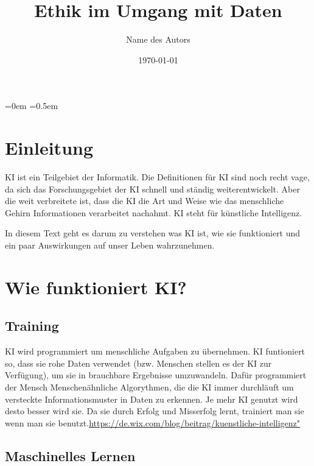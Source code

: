 \documentclass{report}
\title{Ethik im Umgang mit Daten}
\author{Name des Autors}
\date{\today}
\begin{document}
\maketitle


\tableofcontents
\parindent=0em
\parskip=0.5em
\chapter{Einleitung}

KI ist ein Teilgebiet der Informatik. Die Definitionen für KI sind noch recht vage, da sich das Forschungsgebiet der KI schnell und ständig weiterentwickelt. Aber die weit verbreitete ist,
dass die KI die Art und Weise wie das menschliche Gehirn Informationen verarbeitet nachahmt. KI steht für künstliche Intelligenz. 

In diesem Text geht es darum zu verstehen was KI ist, wie sie funktioniert und ein paar Auswirkungen auf unser Leben wahrzunehmen.

\chapter{Wie funktioniert KI?}

\section{Training}
KI wird programmiert um menschliche Aufgaben zu übernehmen.
KI funtioniert so, dass sie rohe Daten verwendet (bzw. Menschen stellen es der KI zur Verfügung), um sie in brauchbare Ergebnisse umzuwandeln.
Dafür programmiert der Mensch Menschenähnliche Algorythmen, die die KI immer durchläuft um versteckte Informationsmuster in Daten zu erkennen.
Je mehr KI genutzt wird desto besser wird sie. Da sie durch Erfolg und Misserfolg lernt, trainiert man sie wenn man sie benutzt.\url{https://de.wix.com/blog/beitrag/kuenstliche-intelligenz"}

\section{ Maschinelles Lernen}
\end{document}
